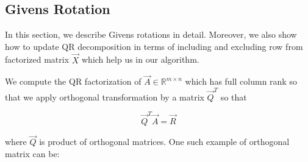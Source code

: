



\subsection*{Givens Rotation} \label{givensrotation}
In this section, we describe Givens rotations in detail. Moreover, we also show how to update QR decomposition in terms of including and excluding row from factorized matrix $\vec{X}$ which help us in our algorithm.

We compute the QR factorization of $\vec{A} \in \mathbb{R}^{m \times n}$ which has full column rank so that we apply orthogonal transformation by a matrix $\vec{Q}^T$ so that \cite{hammarling2008updatingqr}

\begin{equation}
    \vec{Q}^T\vec{A} = \vec{R}
\end{equation}
 
where $\vec{Q}$ is product of orthogonal matrices. One such example of orthogonal matrix can be:

